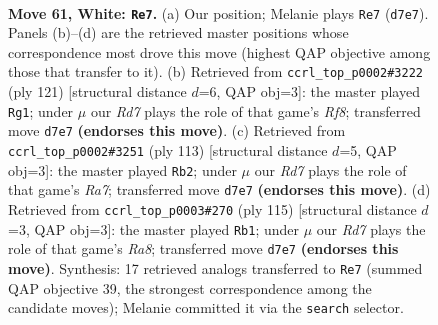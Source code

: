 \documentclass[11pt]{article}
\begin{document}
\clearpage

\begin{figure}[p]\centering
\begin{subfigure}{0.46\textwidth}\centering
\resizebox{\linewidth}{!}{%
\newchessgame
\chessboard[
  setfen={5rk1/3R4/P7/8/6K1/8/8/8 w - - 7 61},
  showmover=false,
  pgfstyle=straightmove, color=movearrow, markmove={d7-e7}
]}
\caption{}
\end{subfigure}\hfill
\begin{subfigure}{0.46\textwidth}\centering
\resizebox{\linewidth}{!}{%
\newchessgame
\chessboard[
  setfen={4K3/4R1P1/8/8/1p1k4/8/8/5r2 b - - 20 61},
  showmover=false,
  pgfstyle=straightmove, color=movearrow, markmove={f1-g1}
]}
\caption{}
\end{subfigure}
\\[4pt]
\begin{subfigure}{0.46\textwidth}\centering
\resizebox{\linewidth}{!}{%
\newchessgame
\chessboard[
  setfen={8/8/8/5k1p/7P/8/r7/6RK b - - 4 57},
  showmover=false,
  pgfstyle=straightmove, color=movearrow, markmove={a2-b2}
]}
\caption{}
\end{subfigure}\hfill
\begin{subfigure}{0.46\textwidth}\centering
\resizebox{\linewidth}{!}{%
\newchessgame
\chessboard[
  setfen={8/1KR5/8/1P1k4/8/8/8/r7 b - - 12 58},
  showmover=false,
  pgfstyle=straightmove, color=movearrow, markmove={a1-b1}
]}
\caption{}
\end{subfigure}
\caption{\textbf{Move 61, White: \texttt{Re7}.} (a) Our position; Melanie plays \texttt{Re7} (\texttt{d7e7}). Panels (b)--(d) are the retrieved master positions whose correspondence most drove this move (highest QAP objective among those that transfer to it). (b) Retrieved from \texttt{ccrl\_top\_p0002\#3222} (ply 121) [structural distance $d$=6, QAP obj=3]: the master played \texttt{Rg1}; under $\mu$ our \emph{Rd7} plays the role of that game's \emph{Rf8}; transferred move \texttt{d7e7} \textbf{(endorses this move)}. (c) Retrieved from \texttt{ccrl\_top\_p0002\#3251} (ply 113) [structural distance $d$=5, QAP obj=3]: the master played \texttt{Rb2}; under $\mu$ our \emph{Rd7} plays the role of that game's \emph{Ra7}; transferred move \texttt{d7e7} \textbf{(endorses this move)}. (d) Retrieved from \texttt{ccrl\_top\_p0003\#270} (ply 115) [structural distance $d$=3, QAP obj=3]: the master played \texttt{Rb1}; under $\mu$ our \emph{Rd7} plays the role of that game's \emph{Ra8}; transferred move \texttt{d7e7} \textbf{(endorses this move)}. Synthesis: 17 retrieved analogs transferred to \texttt{Re7} (summed QAP objective 39, the strongest correspondence among the candidate moves); Melanie committed it via the \texttt{search} selector.}
\label{fig:thought-m120}
\end{figure}
\end{document}
